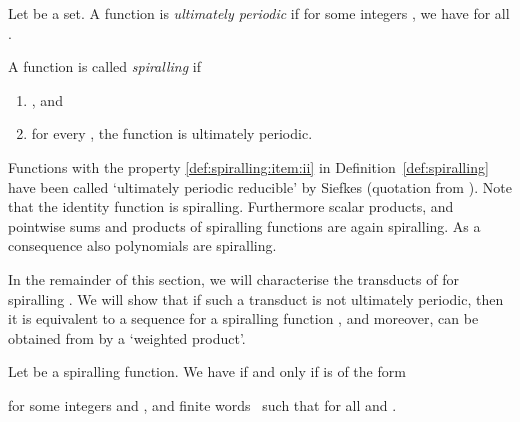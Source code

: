\begin{definition}\label{def:periodic}
  Let  be a set.
  A function  
  is \emph{ultimately periodic}
  if for some integers ,  we have
   for all .
\end{definition}  

\begin{definition}\label{def:spiralling}
  A function  
  is called \emph{spiralling}
  if 
  \begin{enumerate}
    \item{}\label{def:spiralling:item:i}
      , and
    \item{}\label{def:spiralling:item:ii} 
      for every , the function  is ultimately periodic.
  \end{enumerate}
\end{definition}

Functions with the property \ref{def:spiralling:item:ii} in Definition~\ref{def:spiralling}
have been called `ultimately periodic reducible' by Siefkes \cite{sief:1971} (quotation from \cite{seif:mcna:1976}). 
Note that the identity function is spiralling.
Furthermore scalar products, and pointwise sums and products of spiralling functions 
are again spiralling. 
As a consequence also polynomials  are spiralling.

In the remainder of this section, we will characterise the transducts  of  for spiralling .
We will show that if such a transduct  is not ultimately periodic, 
then it is equivalent to a sequence  for a spiralling function , 
and moreover,  can be obtained from  by a `weighted product'.

\begin{lemma}\label{lem:transducts}
  Let  be a spiralling function.
  We have 
  if and only if 
   is of the form
  
  for some integers  and , 
  and finite words~ 
  such that  for all  and .
\end{lemma}


